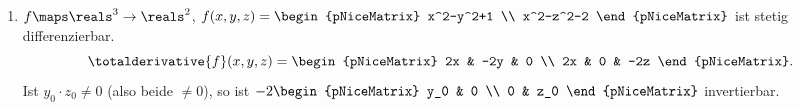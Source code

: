 \begin{beispiele*}
  \begin{enumerate}
    \item \label{implizite_funktion_beispiel_fuer_dgls}\( f\maps \reals^3\to \reals^2 \), \( f(x,y,z)=\begin{pNiceMatrix} x^2-y^2+1 \\ x^2-z^2-2 \end{pNiceMatrix} \) ist stetig differenzierbar.
    \begin{equation*}
      \totalderivative{f}(x,y,z)=\begin{pNiceMatrix} 2x & -2y & 0 \\ 2x & 0 & -2z \end{pNiceMatrix}.
    \end{equation*}
    Ist  \( y_0\cdot z_0\neq 0 \) (also beide \( \neq 0 \)), so ist \( -2 \begin{pNiceMatrix} y_0 & 0 \\ 0 & z_0 \end{pNiceMatrix} \) invertierbar.


\end{enumerate}
\end{beispiele*}
